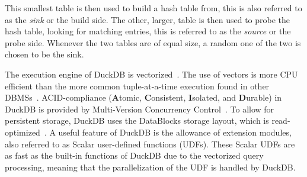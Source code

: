 This smallest table is then used to build a hash table from, this is also referred to as the \textit{sink} or the build side. 
The other, larger, table is then used to probe the hash table, looking for matching entries, this is referred to as the \textit{source} or the probe side.
Whenever the two tables are of equal size, a random one of the two is chosen to be the sink. 



The execution engine of DuckDB is vectorized~\cite{DBLP:conf/sigmod/RaasveldtM19}. The use of vectors is more CPU efficient than the more common tuple-at-a-time execution found in other DBMSs~\cite{DBLP:conf/cidr/BonczZN05}. 
ACID-compliance (\textbf{A}tomic, \textbf{C}onsistent, \textbf{I}solated, and \textbf{D}urable) in DuckDB is provided by Multi-Version Concurrency Control~\cite{DBLP:conf/sigmod/RaasveldtM19}.
To allow for persistent storage, DuckDB uses the DataBlocks storage layout, which is read-optimized~\cite{DBLP:conf/sigmod/RaasveldtM19}.
A useful feature of DuckDB is the allowance of extension modules, also referred to as Scalar user-defined functions (UDFs).
These Scalar UDFs are as fast as the built-in functions of DuckDB due to the vectorized query processing, meaning that the parallelization of the UDF is handled by DuckDB. 


